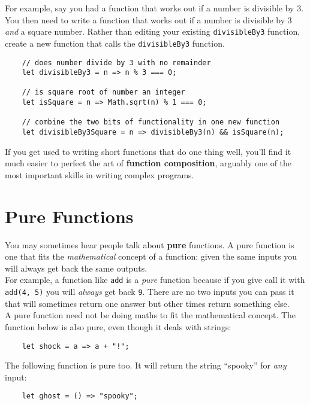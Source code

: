 For example, say you had a function that works out if a number is divisible by 3. You then need to write a function that works out if a number is divisible by 3 \textit{and} a square number. Rather than editing your existing \texttt{divisibleBy3} function, create a new function that calls the \texttt{divisibleBy3} function.

\begin{verbatim}
    // does number divide by 3 with no remainder
    let divisibleBy3 = n => n % 3 === 0;

    // is square root of number an integer
    let isSquare = n => Math.sqrt(n) % 1 === 0;

    // combine the two bits of functionality in one new function
    let divisibleBy3Square = n => divisibleBy3(n) && isSquare(n);
\end{verbatim}

If you get used to writing short functions that do one thing well, you'll find it much easier to perfect the art of \textbf{function composition}, arguably one of the most important skills in writing complex programs.


\section{Pure Functions}

You may sometimes hear people talk about \textbf{pure} functions. A pure function is one that fits the \textit{mathematical} concept of a function: given the same inputs you will always get back the same outputs.
\\

For example, a function like \texttt{add} is a \textit{pure} function because if you give call it with \texttt{add(4, 5)} you will \textit{always} get back \texttt{9}. There are no two inputs you can pass it that will sometimes return one answer but other times return something else.
\\

A pure function need not be doing maths to fit the mathematical concept. The function below is also pure, even though it deals with strings:

\begin{verbatim}
    let shock = a => a + "!";
\end{verbatim}

The following function is pure too. It will return the string ``spooky'' for \textit{any} input:

\begin{verbatim}
    let ghost = () => "spooky";
\end{verbatim}

